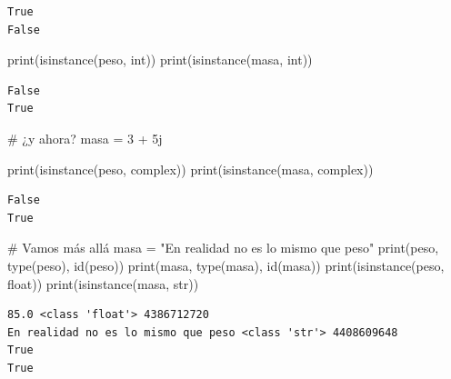 \documentclass[
  spanish,
  letterpaper,
]{scrbook}
\newenvironment{Shaded}{\begin{snugshade}}{\end{snugshade}}
\newcommand{\BuiltInTok}[1]{\textcolor[rgb]{0.00,0.23,0.31}{#1}}
\newcommand{\CommentTok}[1]{\textcolor[rgb]{0.37,0.37,0.37}{#1}}
\newcommand{\DecValTok}[1]{\textcolor[rgb]{0.68,0.00,0.00}{#1}}
\newcommand{\NormalTok}[1]{\textcolor[rgb]{0.00,0.23,0.31}{#1}}
\newcommand{\OperatorTok}[1]{\textcolor[rgb]{0.37,0.37,0.37}{#1}}
\newcommand{\OtherTok}[1]{\textcolor[rgb]{0.00,0.23,0.31}{#1}}
\newcommand{\StringTok}[1]{\textcolor[rgb]{0.13,0.47,0.30}{#1}}
\theoremstyle{definition}
\theoremstyle{remark}
\begin{document}
\begin{verbatim}
True
False
\end{verbatim}

\begin{Shaded}
\begin{Highlighting}[]
\BuiltInTok{print}\NormalTok{(}\BuiltInTok{isinstance}\NormalTok{(peso, }\BuiltInTok{int}\NormalTok{))}
\BuiltInTok{print}\NormalTok{(}\BuiltInTok{isinstance}\NormalTok{(masa, }\BuiltInTok{int}\NormalTok{))}
\end{Highlighting}
\end{Shaded}

\begin{verbatim}
False
True
\end{verbatim}

\begin{Shaded}
\begin{Highlighting}[]
\CommentTok{\# ¿y ahora?}
\NormalTok{masa }\OperatorTok{=} \DecValTok{3} \OperatorTok{+} \OtherTok{5j}

\BuiltInTok{print}\NormalTok{(}\BuiltInTok{isinstance}\NormalTok{(peso, }\BuiltInTok{complex}\NormalTok{))}
\BuiltInTok{print}\NormalTok{(}\BuiltInTok{isinstance}\NormalTok{(masa, }\BuiltInTok{complex}\NormalTok{))}
\end{Highlighting}
\end{Shaded}

\begin{verbatim}
False
True
\end{verbatim}

\begin{Shaded}
\begin{Highlighting}[]
\CommentTok{\# Vamos más allá}
\NormalTok{masa }\OperatorTok{=} \StringTok{"En realidad no es lo mismo que peso"}
\BuiltInTok{print}\NormalTok{(peso, }\BuiltInTok{type}\NormalTok{(peso), }\BuiltInTok{id}\NormalTok{(peso))}
\BuiltInTok{print}\NormalTok{(masa, }\BuiltInTok{type}\NormalTok{(masa), }\BuiltInTok{id}\NormalTok{(masa))}
\BuiltInTok{print}\NormalTok{(}\BuiltInTok{isinstance}\NormalTok{(peso, }\BuiltInTok{float}\NormalTok{))}
\BuiltInTok{print}\NormalTok{(}\BuiltInTok{isinstance}\NormalTok{(masa, }\BuiltInTok{str}\NormalTok{))}
\end{Highlighting}
\end{Shaded}

\begin{verbatim}
85.0 <class 'float'> 4386712720
En realidad no es lo mismo que peso <class 'str'> 4408609648
True
True
\end{verbatim}
\end{document}
